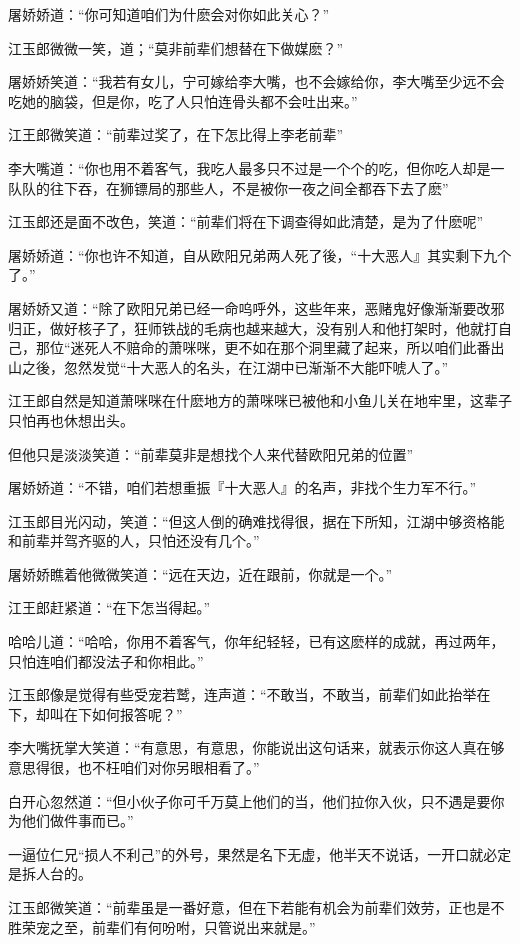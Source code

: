 \documentclass[12pt,oneside]{book}
\begin{document}
屠娇娇道：``你可知道咱们为什麽会对你如此关心？''

江玉郎微微一笑，道；``莫非前辈们想替在下做媒麽？''

屠娇娇笑道：``我若有女儿，宁可嫁给李大嘴，也不会嫁给你，李大嘴至少远不会吃她的脑袋，但是你，吃了人只怕连骨头都不会吐出来。''

江王郎微笑道：``前辈过奖了，在下怎比得上李老前辈''

李大嘴道：``你也用不着客气，我吃人最多只不过是一个个的吃，但你吃人却是一队队的往下吞，在狮镖局的那些人，不是被你一夜之间全都吞下去了麽''

江玉郎还是面不改色，笑道：``前辈们将在下调查得如此清楚，是为了什麽呢''

屠娇娇道：``你也许不知道，自从欧阳兄弟两人死了後，``十大恶人』其实剩下九个了。''

屠娇娇又道：``除了欧阳兄弟已经一命呜呼外，这些年来，恶赌鬼好像渐渐要改邪归正，做好核子了，狂师铁战的毛病也越来越大，没有别人和他打架时，他就打自己，那位``迷死人不赔命的萧咪咪，更不如在那个洞里藏了起来，所以咱们此番出山之後，忽然发觉``十大恶人的名头，在江湖中已渐渐不大能吓唬人了。''

江王郎自然是知道萧咪咪在什麽地方的萧咪咪已被他和小鱼儿关在地牢里，这辈子只怕再也休想出头。

但他只是淡淡笑道：``前辈莫非是想找个人来代替欧阳兄弟的位置''

屠娇娇道：``不错，咱们若想重振『十大恶人』的名声，非找个生力军不行。''

江玉郎目光闪动，笑道：``但这人倒的确难找得很，据在下所知，江湖中够资格能和前辈并驾齐驱的人，只怕还没有几个。''

屠娇娇瞧着他微微笑道：``远在天边，近在跟前，你就是一个。''

江王郎赶紧道：``在下怎当得起。''

哈哈儿道：``哈哈，你用不着客气，你年纪轻轻，已有这麽样的成就，再过两年，只怕连咱们都没法子和你相此。''

江玉郎像是觉得有些受宠若鹫，连声道：``不敢当，不敢当，前辈们如此抬举在下，却叫在下如何报答呢？''

李大嘴抚掌大笑道：``有意思，有意思，你能说出这句话来，就表示你这人真在够意思得很，也不枉咱们对你另眼相看了。''

白开心忽然道：``但小伙子你可千万莫上他们的当，他们拉你入伙，只不遇是要你为他们做件事而已。''

一逼位仁兄``损人不利己''的外号，果然是名下无虚，他半天不说话，一开口就必定是拆人台的。

江玉郎微笑道：``前辈虽是一番好意，但在下若能有机会为前辈们效劳，正也是不胜荣宠之至，前辈们有何吩咐，只管说出来就是。''
\end{document}

